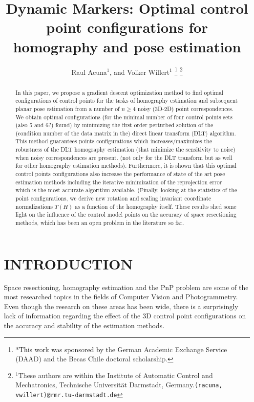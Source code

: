 \documentclass[letterpaper, 10 pt, conference]{ieeeconf}  %
\title{\LARGE \bf
Dynamic Markers: Optimal control point configurations for homography and pose estimation
}
\author{Raul Acuna$^{1}$, and Volker Willert$^{1}$%
\thanks{*This work was sponsored by the German Academic Exchange Service (DAAD) and the Becas Chile doctoral scholarship.}%
\thanks{$^{1}$These authors are within the Institute of Automatic Control and Mechatronics, Technische Universit{\"a}t Darmstadt, Germany.{\tt\small (racuna, vwillert)}{\tt\small @rmr.tu-darmstadt.de}}}
\begin{document}
\maketitle
\thispagestyle{empty}
\pagestyle{empty}
\begin{abstract}
In this paper, we propose a gradient descent optimization method to find optimal configurations of control points for the tasks of homography estimation and subsequent planar pose estimation from a number of $n \geq 4$ noisy (3D-2D) point correspondences. We obtain optimal configurations (for the minimal number of four control points sets (also 5 and 6?) found) by minimizing the first order perturbed solution of the (condition number of the data matrix in the) direct linear transform (DLT) algorithm. This method guarantees points configurations which increases/maximizes the robustness of the DLT homography estimation (that minimize the sensitivity to noise) when noisy correspondences are present.
(not only for the DLT transform but as well for other homography estimation methods). Furthermore, it is shown that this optimal control points configurations also increase the performance of state of the art pose estimation methods including the iterative minimization of the reprojection error which is the most accurate algorithm available. (Finally, looking at the statistics of the point configurations, we derive new rotation and scaling invariant coordinate normalizations $T(H)$ as a function of the homography itself. These results shed some light on the influence of the control model points on the accuracy of space resectioning methods, which has been an open problem in the literature so far.
\end{abstract}

\section{INTRODUCTION}

Space resectioning, homography estimation and the PnP problem are some of the most researched topics in the fields of Computer Vision and Photogrammetry. Even though the research on these areas has been wide, there is a surprisingly lack of information regarding the effect of the 3D control point configurations on the accuracy and stability of the estimation methods.
\end{document}
